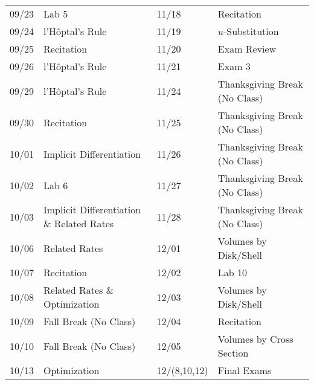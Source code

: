 \documentclass[11pt,letterpaper]{article}
\begin{document}
\begin{table}[!ht]
{\begin{tabular}{ll || ll}
	09/23 & Lab 5 & 11/18 & Recitation \\
	09/24 & l'H\^{o}ptal's Rule & 11/19 & $u$-Substitution \\
	09/25 & Recitation & 11/20 & Exam Review \\
	09/26 & l'H\^{o}ptal's Rule & 11/21 & Exam 3 \\
	09/29 & l'H\^{o}ptal's Rule & 11/24 & Thanksgiving Break (No Class) \\
	09/30 & Recitation & 11/25 & Thanksgiving Break (No Class) \\
	10/01 & Implicit Differentiation & 11/26 & Thanksgiving Break (No Class) \\
	10/02 & Lab 6 & 11/27 & Thanksgiving Break (No Class) \\
	10/03 & Implicit Differentiation \& Related Rates & 11/28 & Thanksgiving Break (No Class) \\
	10/06 & Related Rates & 12/01 & Volumes by Disk/Shell \\
	10/07 & Recitation & 12/02 & Lab 10 \\
	10/08 & Related Rates \& Optimization & 12/03 & Volumes by Disk/Shell \\
	10/09 & Fall Break (No Class) & 12/04 & Recitation \\
	10/10 & Fall Break (No Class) & 12/05 & Volumes by Cross Section \\
	10/13 & Optimization & 12/(8,10,12) & Final Exams
        \end{tabular}
        }
        \end{table}
\end{document}
